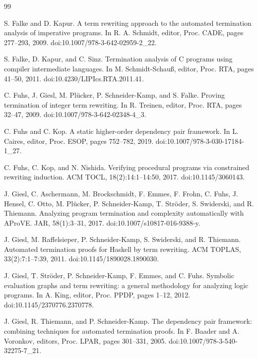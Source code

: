 \documentclass[10pt,a4paper]{amsart}
\begin{document}
\begin{thebibliography}{99}
\par\noindent  [10]  S. Falke and D. Kapur.  A term rewriting approach to the automated termination analysis of imperative programs.  In R. A. Schmidt, editor, Proc. CADE, pages 277–293, 2009.  doi:10.1007/978-3-642-02959-2\_22.  
 
\par\noindent  [11]  S. Falke, D. Kapur, and C. Sinz.  Termination analysis of C programs using compiler intermediate languages.  In M. Schmidt-Schauß, editor, Proc. RTA, pages 41–50, 2011.  doi:10.4230/LIPIcs.RTA.2011.41.  
 
\par\noindent  [12]  C. Fuhs, J. Giesl, M. Plücker, P. Schneider-Kamp, and S. Falke.  Proving termination of integer term rewriting.  In R. Treinen, editor, Proc. RTA, pages 32–47, 2009.  doi:10.1007/978-3-642-02348-4\_3.  
 
\par\noindent  [13]  C. Fuhs and C. Kop.  A static higher-order dependency pair framework.  In L. Caires, editor, Proc. ESOP, pages 752–782, 2019.  doi:10.1007/978-3-030-17184-1\_27.  
 
\par\noindent  [14]  C. Fuhs, C. Kop, and N. Nishida.  Verifying procedural programs via constrained rewriting induction.  ACM TOCL, 18(2):14:1–14:50, 2017.  doi:10.1145/3060143.  
 
\par\noindent  [15]  J. Giesl, C. Aschermann, M. Brockschmidt, F. Emmes, F. Frohn, C. Fuhs, J. Hensel, C. Otto, M. Plücker, P. Schneider-Kamp, T. Ströder, S. Swiderski, and R. Thiemann.  Analyzing program termination and complexity automatically with AProVE.  JAR, 58(1):3–31, 2017.  doi:10.1007/s10817-016-9388-y.  
 
\par\noindent  [16]  J. Giesl, M. Raffelsieper, P. Schneider-Kamp, S. Swiderski, and R. Thiemann.  Automated termination proofs for Haskell by term rewriting.  ACM TOPLAS, 33(2):7:1–7:39, 2011.  doi:10.1145/1890028.1890030.  
 
\par\noindent  [17]  J. Giesl, T. Ströder, P. Schneider-Kamp, F. Emmes, and C. Fuhs.  Symbolic evaluation graphs and term rewriting: a general methodology for analyzing logic programs.  In A. King, editor, Proc. PPDP, pages 1–12, 2012.  doi:10.1145/2370776.2370778.  
 
\par\noindent  [18]  J. Giesl, R. Thiemann, and P. Schneider-Kamp.  The dependency pair framework: combining techniques for automated termination proofs.  In F. Baader and A. Voronkov, editors, Proc. LPAR, pages 301–331, 2005.  doi:10.1007/978-3-540-32275-7\_21.  
 

\end{thebibliography}
\end{document}
